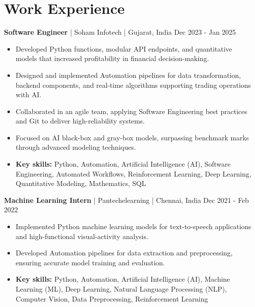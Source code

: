 \documentclass[a4paper,10pt]{article}
\begin{document}
\section*{Work Experience}
\textbf{Software Engineer} | Soham Infotech | Gujarat, India \hfill Dec 2023 - Jan 2025\par
\begin{itemize}
\item Developed Python functions, modular API endpoints, and quantitative models that increased profitability in financial decision-making.
\item Designed and implemented Automation pipelines for data transformation, backend components, and real-time algorithms supporting trading operations with AI.
\item Collaborated in an agile team, applying Software Engineering best practices and Git to deliver high-reliability systems.
\item Focused on AI black-box and gray-box models, surpassing benchmark marks through advanced modeling techniques.
\item \textbf{Key skills:} Python, Automation, Artificial Intelligence (AI), Software Engineering, Automated Workflows, Reinforcement Learning, Deep Learning, Quantitative Modeling, Mathematics, SQL
\end{itemize}
\vspace{3pt}
\textbf{Machine Learning Intern} | Pantechelearning | Chennai, India \hfill Dec 2021 - Feb 2022\par
\begin{itemize}
\item Implemented Python machine learning models for text-to-speech applications and high-functional visual-activity analysis.
\item Developed Automation pipelines for data extraction and preprocessing, ensuring accurate model training and evaluation.
\item \textbf{Key skills:} Python, Automation, Artificial Intelligence (AI), Machine Learning (ML), Deep Learning, Natural Language Processing (NLP), Computer Vision, Data Preprocessing, Reinforcement Learning
\end{itemize}
\vspace{3pt}
\end{document}
